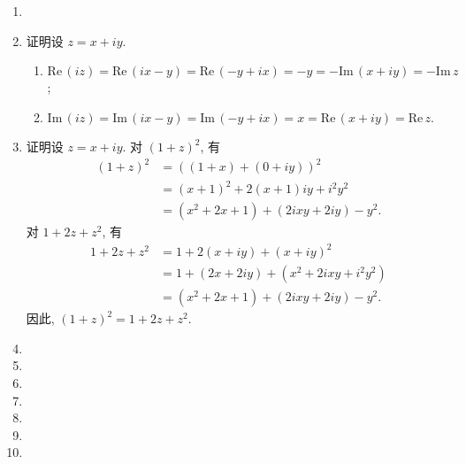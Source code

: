 \documentclass[a4paper, 11pt]{ctexart}
\newcommand{\re}{\mathrm{Re}\,}
\newcommand{\im}{\mathrm{Im}\,}
\begin{document}
\pagestyle{empty}
\begin{enumerate}
    \item %
    \item %
        {\heiti 证明}\quad 设 $z = x + iy$.
        \begin{enumerate}
            \item %
                $\re(iz) = \re(ix - y) = \re(-y + ix) = -y = -\im(x + iy) = -\im z$;
            \item %
                $\im(iz) = \im(ix - y) = \im(-y + ix) = x = \re(x + iy) = \re z$.
        \end{enumerate}
    \item %
        {\heiti 证明}\quad 设 $z = x + iy$. 对 $(1 + z)^2$, 有
        \begin{align*}
            (1 + z)^2 &= ((1+x) + (0+iy))^2 \\
                      &= (x+1)^2 + 2(x+1)iy + i^2y^2 \\
                      &= (x^2 + 2x + 1) + (2ixy + 2iy) - y^2.
        \end{align*}
        对 $1 + 2z + z^2$, 有
        \begin{align*}
            1 + 2z + z^2 &= 1 + 2(x + iy) + (x + iy)^2 \\
                         &= 1 + (2x + 2iy) + (x^2 + 2ixy + i^2y^2) \\
                         &= (x^2 + 2x + 1) + (2ixy + 2iy) - y^2.
        \end{align*}
        因此, $(1 + z)^2 = 1 + 2z + z^2$.
    \item %
    \item %
    \item %
    \item %
    \item %
    \item %
    \item %
\end{enumerate}
\end{document}
